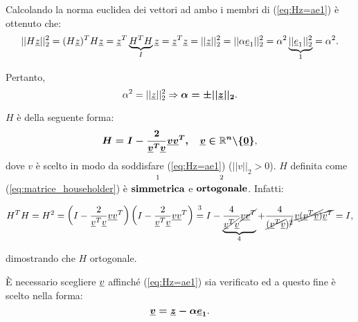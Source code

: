 Calcolando la norma euclidea dei vettori ad ambo i membri di (\ref{eq:Hz=ae1}) è ottenuto che:
\begin{equation*}
    ||H\uline z||_2^2 = (H\uline z)^TH\uline z=\uline z^T\underbrace{H^TH}_{I}\uline z = \uline z^T\uline z=||\uline z||_2^2 = ||\alpha \uline e_1||_2^2 = \alpha^2 \underbrace{||\uline e_1||_2^2}_{1} = \alpha^2.
\end{equation*}

Pertanto,
\begin{equation}\label{eq:aNormZ}
    \alpha^2=||\uline z||_2^2\Rightarrow\boldsymbol{\alpha = \pm ||\uline z||_2}.
\end{equation}

$H$ è della seguente forma:
\begin{equation}\label{eq:matrice_householder}
    \boldsymbol{H=I-\frac{2}{\uline v^T\uline v}\uline v\uline v^T,\quad \uline v\in\mathbb R^n\backslash\{\uline 0\}},
\end{equation}
dove $v$ è scelto in modo da soddisfare (\ref{eq:Hz=ae1}) ($||v||_2>0$). $H$ definita come (\ref{eq:matrice_householder}) è $\overset{\footnotemark}{\text{\textbf{simmetrica}}}$ e $\overset{\footnotemark}{\text{\textbf{ortogonale}}}$. Infatti:
\addtocounter{footnote}{-1}

\begin{equation*}
    H^TH=H^2=\left(I-\frac{2}{\uline v^T\uline v}\uline v\uline v^T\right)\left(I-\frac{2}{\uline v^T\uline v}\uline v\uline v^T\right) \overset{\footnotemark}{=}I - \underbrace{\frac{4}{\cancel{\uline v^T\uline v}}\cancel{\uline v\uline v^T}}_{\footnotemark} + \frac{4}{\cancel{(\uline v^T\uline v})^{\cancel{2}}}\cancel{\uline v \cancel{(\uline v^T \uline v)}\uline v^T} = I,
\end{equation*}
dimostrando che $H$ ortogonale.
\addtocounter{footnote}{-1}


È necessario scegliere $\uline v$ affinché (\ref{eq:Hz=ae1}) sia verificato ed a questo fine è scelto nella forma:
\begin{equation}\label{eq:vettore_householder}
    \boldsymbol{\uline v = \uline z-\alpha\uline e_1}.
\end{equation}


